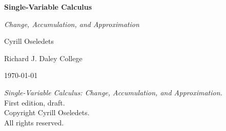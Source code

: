 \thispagestyle{empty}
\begin{titlepage}
  \centering
  \vspace*{2cm}

  {\Huge\sffamily\bfseries Single-Variable Calculus\par}
  \vspace{1cm}
  {\Large\sffamily\itshape Change, Accumulation, and Approximation\par}
  \vfill

  {\Large Cyrill Oseledets\par}
  \vspace{0.5cm}
  {\large Richard J. Daley College\par}
  \vfill

  {\large \today\par}
\end{titlepage}

\thispagestyle{empty}
\null
\vfill
\noindent\textit{Single-Variable Calculus: Change, Accumulation, and Approximation.}\\
First edition, draft.\\[1ex]
Copyright \textcopyright{} \the\year{} Cyrill Oseledets.\\[1ex]
\noindent All rights reserved.
\clearpage
